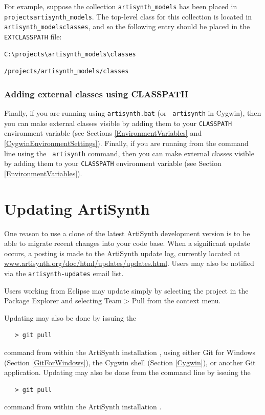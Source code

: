 For example, suppose the collection {\tt artisynth\_models}
has been placed in {\tt \TOP projects\SEP artisynth\_models}.
The top-level class \directory{} for this collection is located
in {\tt artisynth\_models\SEP classes}, and so the following entry
should be placed in the {\tt EXTCLASSPATH} file:

\ifWindows
\begin{verbatim}
C:\projects\artisynth_models\classes
\end{verbatim}
\else
\begin{verbatim}
/projects/artisynth_models/classes
\end{verbatim}
\fi

\subsubsection{Adding external classes using CLASSPATH}

\ifWindows
Finally, if you are running using {\tt artisynth.bat} (or {\tt
artisynth} in Cygwin), then you can make external classes visible by
adding them to your {\tt CLASSPATH} environment variable (see Sections
\ref{EnvironmentVariables} and \ref{CygwinEnvironmentSettings}).
\else
Finally, if you are running from the command line using the {\tt
artisynth} command, then you can make external classes visible by adding
them to your {\tt CLASSPATH} environment variable (see Section
\ref{EnvironmentVariables}).
\fi

\section{Updating ArtiSynth}
\label{UpdatingArtiSynth}

One reason to use a clone of the latest ArtiSynth
development version is to be able to migrate recent changes into your
code base. When a significant update occurs, a posting is made to the
ArtiSynth update log, currently located at
\href{\artisynthDocBase/html/updates/updates.html}%
{www.artisynth.org/doc/html/updates/updates.html}.
Users may also be notified via the {\tt artisynth-updates} email list.

Users working from Eclipse may update simply by selecting
the project in the {\sf Package Explorer} and selecting {\sf Team >
Pull} from the context menu.

\ifWindows
Updating may also be done by issuing the 
\begin{verbatim}
   > git pull
\end{verbatim}
command from within the ArtiSynth installation \directory{}, 
using either Git for Windows (Section \ref{GitForWindows}),
the Cygwin shell (Section \ref{Cygwin}), or another Git application.
\else
Updating may also be done from the command line by issuing the 
\begin{verbatim}
   > git pull
\end{verbatim}
command from within the ArtiSynth installation \directory{}.
\fi


